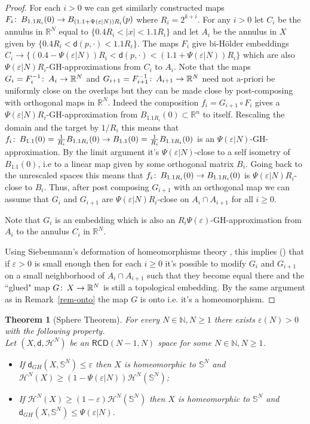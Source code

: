 \documentclass[a4paper]{amsart}
\newcounter{assu}
\theoremstyle{plain}
\newtheorem{theorem}[lemma]{Theorem}
\theoremstyle{definition}
\numberwithin{equation}{section}
\newcommand{\R}{\mathbb{R}}
\newcommand{\bS}{\mathbb{S}}
\newcommand{\N}{\mathbb{N}}
\newcommand{\RCD}{\mathsf{RCD}}
\newcommand{\sfd}{\mathsf d}
\newcommand{\cH}{\mathcal{H}}
\newcommand{\eps}{\varepsilon}
\def\co{\colon\thinspace}
\begin{document}
{\begin{proof}
For each $i>0$ we can get similarly constructed maps $F_i\co B_{1.1R_i}(0)\to  B_{(1.1+\Psi(\eps|N))R_i}(p)$ where $R_i=2^{k+i}$. For any $i>0$ let $C_i$ be the annulus in $\R^N$ equal to $\{0.4R_i<|x|<1.1R_i\}$ and let $A_i$ be the annulus in $X$ given by $\{0.4 R_i<\sfd(p, \cdot)< 1.1R_i\}$. The maps $F_i$ give bi-H\"older embeddings $C_i\to \{(0.4-\Psi(\eps|N))R_i<\sfd(p,\cdot)< (1.1+\Psi(\eps|N))R_i\}$ which are also $\Psi(\eps|N)R_i$-GH-approximations from $C_i$ to $A_i$. Note that the maps $G_i=F_i^{-1} \co A_i\to \R^N$ and $G_{i+1}=F_{i+1}^{-1} \co A_{i+1}\to \R^N$ need not a-priori be uniformly close on the overlaps but they can be made close by post-composing with orthogonal maps in $\R^N$.  Indeed the composition $f_i=G_{i+1}\circ F_i$ gives a $\Psi(\eps|N)R_i$-GH-approximation from  $B_{1.1R_i}(0)\subset \R^n$ to itself. Rescaling the domain and the target by $1/R_i$ this means that $f_i\co B_{1.1}(0)=\frac{1}{R_i} B_{1.1R_i}(0)\to B_{1.1}(0)=\frac{1}{R_i} B_{1.1R_i}(0)$ is an $\Psi(\eps|N)$-GH-approximation. By the limit argument it's $\Psi(\eps|N)$-close to a self  isometry of $B_{1.1}(0)$, i.e to a linear map given by some orthogonal matrix $B_i$. Going back to the unrescaled spaces this means that $f_i\co B_{1.1R_i}(0)\to B_{1.1R_i}(0)$ is  $\Psi(\eps|N)R_i$-close to $B_i$.
Thus, after post composing  $G_{i+1}$ with an orthogonal map we can assume that $G_i$ and $G_{i+1}$ are $\Psi(\eps|N)R_i$-close on
$A_i\cap A_{i+1}$ for all $i\ge 0$.  


 Note that $G_i$ is an embedding which is also an $R_i\Psi(\eps)$-GH-approximation from  $A_i$ to the annulus $C_i$ in $\R^N$.


Using  Siebenmann's deformation of homeomorphisms theory \cite{Sieb},  this implies  (\cite[Theorem 4.11]{Kap07}) that if $\eps>0$ is small enough then  for each $i\ge 0$ it's possible to modify  $G_i$ and $G_{i+1}$ on a small neighborhood of $A_i\cap A_{i+1}$ such that they become equal there and the ``glued" map $ G\co X\to \R^N$  is still a topological embedding.
 By the same argument as in Remark~\ref{rem-onto} the map $G$ is onto i.e. it's a homeomorphism.

\end{proof}

\begin{theorem}[Sphere Theorem]\label{thm:Sphere}
For every $N\in \N, N\geq 1$ there exists $\varepsilon(N)>0$ with the following property. 
\\Let $(X,\sfd, \cH^{N})$ be an $\RCD(N-1,N)$ space for some  $N\in \N, N\geq 1$.
\begin{itemize}
\item If $\sfd_{GH}(X,\bS^{N})\leq \varepsilon$ then $X$ is homeomorphic to $\bS^{N}$ and $\cH^{N}(X)\geq (1-\Psi(\varepsilon|N))  \cH^{N}(\bS^{N})$;
\item If $\cH^{N}(X)\geq (1-\varepsilon) \cH^{N}(\bS^{N})$ then  $X$ is homeomorphic to $\bS^{N}$ and $\sfd_{GH}(X,\bS^{N})\leq \Psi(\varepsilon|N)$.
\end{itemize}
\end{theorem}

}
\end{document}

